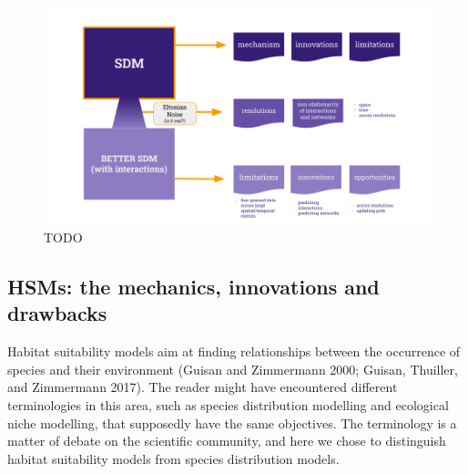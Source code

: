 \documentclass[12pt]{article}
\makeatletter
\def\maxwidth{\ifdim\Gin@nat@width>\linewidth\linewidth
\else\Gin@nat@width\fi}
\let\Oldincludegraphics\includegraphics
\renewcommand{\includegraphics}[1]{\Oldincludegraphics[width=\maxwidth]{#1}}
\makeatother
\begin{document}
\begin{figure}
\centering
\includegraphics{figures/concept.png}
\caption{TODO}
\end{figure}

\hypertarget{hsms-the-mechanics-innovations-and-drawbacks}{%
\subsection{HSMs: the mechanics, innovations and
drawbacks}\label{hsms-the-mechanics-innovations-and-drawbacks}}

Habitat suitability models aim at finding relationships between the
occurrence of species and their environment (Guisan and Zimmermann 2000;
Guisan, Thuiller, and Zimmermann 2017). The reader might have
encountered different terminologies in this area, such as species
distribution modelling and ecological niche modelling, that supposedly
have the same objectives. The terminology is a matter of debate on the
scientific community, and here we chose to distinguish habitat
suitability models from species distribution models.
\end{document}
